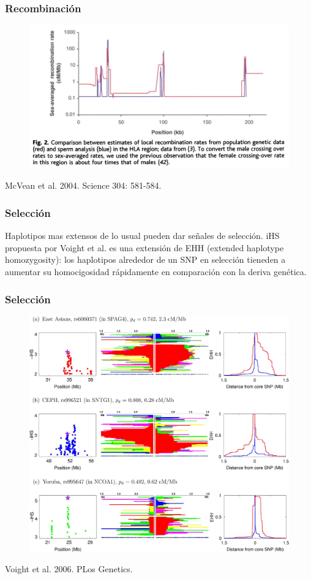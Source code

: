 \documentclass{beamer}\usepackage[]{graphicx}\usepackage[]{color}
\begin{document}
\begin{frame}[fragile]
\frametitle{Recombinaci\'on}


\begin{figure}[htbp]
\begin{center}
\includegraphics[width=.7\linewidth]{recomb.png}
\end{center}
\end{figure}

McVean et al. 2004. Science 304: 581-584. 
\end{frame}


\begin{frame}[fragile]
\frametitle{Selecci\'on}

Haplotipos mas extensos de lo usual pueden dar señales de selecci\'on. 
iHS propuesta por Voight et al. es una extensi\'on de EHH (extended haplotype homozygosity): los haplotipos alrededor de un SNP en selecci\'on tieneden a aumentar su homocigosidad r\'apidamente en comparaci\'on con la deriva gen\'etica.  

\end{frame}

\begin{frame}[fragile]
\frametitle{Selecci\'on}

\begin{figure}[htbp]
\begin{center}
\includegraphics[width=.7\linewidth]{iHS.png}
\end{center}
\end{figure}

Voight et al. 2006. PLos Genetics.  
\end{frame}
\end{document}
